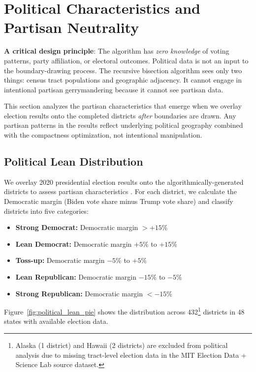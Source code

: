 \section{Political Characteristics and Partisan Neutrality}
\label{sec:analysis}

\textbf{A critical design principle}: The algorithm has \textit{zero knowledge} of voting patterns, party affiliation, or electoral outcomes. Political data is not an input to the boundary-drawing process. The recursive bisection algorithm sees only two things: census tract populations and geographic adjacency. It cannot engage in intentional partisan gerrymandering because it cannot see partisan data.

This section analyzes the partisan characteristics that emerge when we overlay election results onto the completed districts \textit{after} boundaries are drawn. Any partisan patterns in the results reflect underlying political geography combined with the compactness optimization, not intentional manipulation.
\subsection{Political Lean Distribution}

We overlay 2020 presidential election results onto the algorithmically-generated districts to assess partisan characteristics \cite{medsl2020}. For each district, we calculate the Democratic margin (Biden vote share minus Trump vote share) and classify districts into five categories:

\begin{itemize}
    \item \textbf{Strong Democrat:} Democratic margin $> +15\%$
    \item \textbf{Lean Democrat:} Democratic margin $+5\%$ to $+15\%$
    \item \textbf{Toss-up:} Democratic margin $-5\%$ to $+5\%$
    \item \textbf{Lean Republican:} Democratic margin $-15\%$ to $-5\%$
    \item \textbf{Strong Republican:} Democratic margin $< -15\%$
\end{itemize}

Figure~\ref{fig:political_lean_pie} shows the distribution across 432\footnote{Alaska (1 district) and Hawaii (2 districts) are excluded from political analysis due to missing tract-level election data in the MIT Election Data + Science Lab source dataset.} districts in 48 states with available election data.

